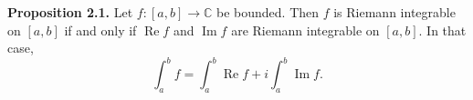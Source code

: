 \textbf{Proposition 2.1.} Let $f: [a, b] \to \mathbb{C}$ be bounded. Then $f$ is Riemann integrable on $[a, b]$ if and only if $\operatorname{Re} f$ and $\operatorname{Im} f$ are Riemann integrable on $[a, b]$. In that case,
$$\int_a^b f = \int_a^b \operatorname{Re} f + i \int_a^b \operatorname{Im} f.$$
